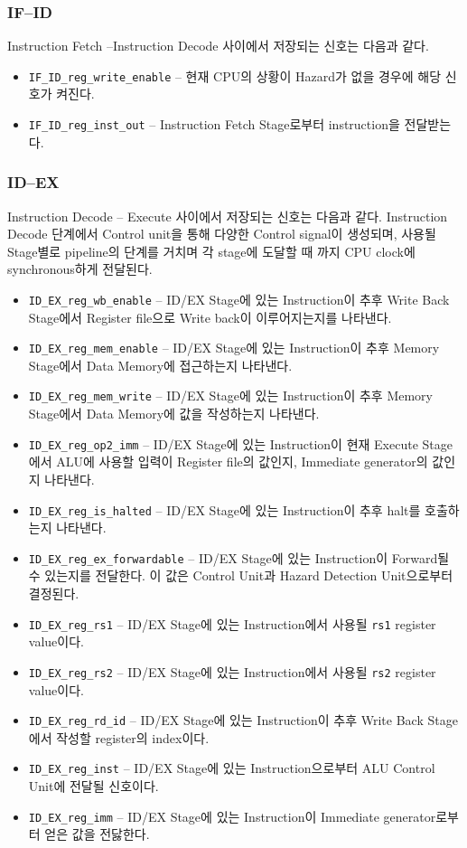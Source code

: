 \documentclass{scrartcl}
\begin{document}
\subsubsection{IF--ID}
Instruction Fetch --Instruction Decode 사이에서 저장되는 신호는 다음과 같다.
\begin{itemize}
  \item \texttt{IF\_ID\_reg\_write\_enable} -- 현재 CPU의 상황이 Hazard가 없을 경우에 해당 신호가 켜진다.
  \item \texttt{IF\_ID\_reg\_inst\_out} -- Instruction Fetch Stage로부터 instruction을 전달받는다.
\end{itemize}

\subsubsection{ID--EX}
Instruction Decode -- Execute 사이에서 저장되는 신호는 다음과 같다.
Instruction Decode 단계에서 Control unit을 통해 다양한 Control signal이 생성되며, 사용될 Stage별로 pipeline의 단계를 거치며
각 stage에 도달할 때 까지 CPU clock에 synchronous하게 전달된다.
\begin{itemize}
  \item \texttt{ID\_EX\_reg\_wb\_enable} -- ID/EX Stage에 있는 Instruction이 추후 Write Back Stage에서 Register file으로 Write back이 이루어지는지를 나타낸다.
  \item \texttt{ID\_EX\_reg\_mem\_enable} -- ID/EX Stage에 있는 Instruction이 추후 Memory Stage에서 Data Memory에 접근하는지 나타낸다.
  \item \texttt{ID\_EX\_reg\_mem\_write} -- ID/EX Stage에 있는 Instruction이 추후 Memory Stage에서 Data Memory에 값을 작성하는지 나타낸다.
  \item \texttt{ID\_EX\_reg\_op2\_imm} -- ID/EX Stage에 있는 Instruction이 현재 Execute Stage에서 ALU에 사용할 입력이 Register file의 값인지, Immediate generator의 값인지 나타낸다.
  \item \texttt{ID\_EX\_reg\_is\_halted} -- ID/EX Stage에 있는 Instruction이 추후 halt를 호출하는지 나타낸다.
  \item \texttt{ID\_EX\_reg\_ex\_forwardable} -- ID/EX Stage에 있는 Instruction이 Forward될 수 있는지를 전달한다. 이 값은 Control Unit과 Hazard Detection Unit으로부터 결정된다.
  \item \texttt{ID\_EX\_reg\_rs1} -- ID/EX Stage에 있는 Instruction에서 사용될 \texttt{rs1} register value이다.
  \item \texttt{ID\_EX\_reg\_rs2} -- ID/EX Stage에 있는 Instruction에서 사용될 \texttt{rs2} register value이다.
  \item \texttt{ID\_EX\_reg\_rd\_id} -- ID/EX Stage에 있는 Instruction이 추후 Write Back Stage에서 작성할 register의 index이다.
  \item \texttt{ID\_EX\_reg\_inst} -- ID/EX Stage에 있는 Instruction으로부터 ALU Control Unit에 전달될 신호이다.
  \item \texttt{ID\_EX\_reg\_imm} -- ID/EX Stage에 있는 Instruction이 Immediate generator로부터 얻은 값을 전닳한다.
\end{itemize}
\end{document}
